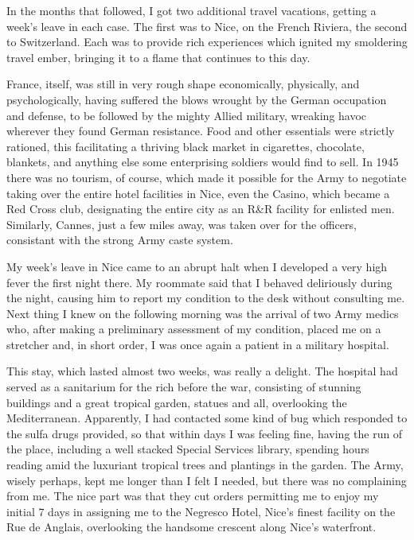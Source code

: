 \documentclass[../m3y]{subfiles}
\begin{document}
In the months that followed, I got two additional travel vacations, getting a week's leave in each case. The first was to Nice, on the French Riviera, the second to Switzerland. Each was to provide rich experiences which ignited my smoldering travel ember, bringing it to a flame that continues to this day.

France, itself, was still in very rough shape economically, physically, and psychologically, having suffered the blows wrought by the German occupation and defense, to be followed by the mighty Allied military, wreaking havoc wherever they found German resistance. Food and other essentials were strictly rationed, this facilitating a thriving black market in cigarettes, chocolate, blankets, and anything else some enterprising soldiers would find to sell. In 1945 there was no tourism, of course, which made it possible for the Army to negotiate taking over the entire hotel facilities in Nice, even the Casino, which became a Red Cross club, designating the entire city as an R\&R facility for enlisted men. Similarly, Cannes, just a few miles away, was taken over for the officers, consistant with the strong Army caste system.

My week's leave in Nice came to an abrupt halt when I developed a very high fever the first night there. My roommate said that I behaved deliriously during the night, causing him to report my condition to the desk without consulting me. Next thing I knew on the following morning was the arrival of two Army medics who, after making a preliminary assessment of my condition, placed me on a stretcher and, in short order, I was once again a patient in a military hospital.

This stay, which lasted almost two weeks, was really a delight. The hospital had served as a sanitarium for the rich before the war, consisting of stunning buildings and a great tropical garden, statues and all, overlooking the Mediterranean. Apparently, I had contacted some kind of bug which responded to the sulfa drugs provided, so that within days I was feeling fine, having the run of the place, including a well stacked Special Services library, spending hours reading amid the luxuriant tropical trees and plantings in the garden. The Army, wisely perhaps, kept me longer than I felt I needed, but there was no complaining from me. The nice part was that they cut orders permitting me to enjoy my initial 7 days in assigning me to the Negresco Hotel, Nice's finest facility on the Rue de Anglais, overlooking the handsome crescent along Nice's waterfront.
\end{document}
